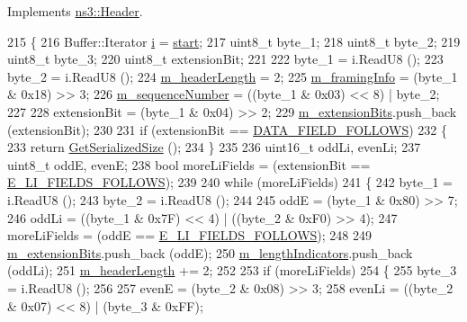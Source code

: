Implements \hyperlink{classns3_1_1Header_a78be9400bb66b2a8543606f395ef5396}{ns3\+::\+Header}.


\begin{DoxyCode}
215 \{
216   Buffer::Iterator \hyperlink{bernuolliDistribution_8m_a6f6ccfcf58b31cb6412107d9d5281426}{i} = \hyperlink{namespacevisualizer_1_1core_a2a35e5d8a34af358b508dac8635754e0}{start};
217   uint8\_t byte\_1;
218   uint8\_t byte\_2;
219   uint8\_t byte\_3;
220   uint8\_t extensionBit;
221 
222   byte\_1 = i.ReadU8 ();
223   byte\_2 = i.ReadU8 ();
224   \hyperlink{classns3_1_1LteRlcHeader_a75ea7af38421120ae0550c1977de4c1c}{m\_headerLength} = 2;
225   \hyperlink{classns3_1_1LteRlcHeader_a04ba07b60e76c561767f53295a830b39}{m\_framingInfo} = (byte\_1 & 0x18) >> 3;
226   \hyperlink{classns3_1_1LteRlcHeader_a345256a1a41193cae2f08b9918e438fc}{m\_sequenceNumber} = ((byte\_1 & 0x03) << 8) | byte\_2;
227 
228   extensionBit = (byte\_1 & 0x04) >> 2;
229   \hyperlink{classns3_1_1LteRlcHeader_a13cb89b13e1ac8572c960b764a30c69b}{m\_extensionBits}.push\_back (extensionBit);
230 
231   \textcolor{keywordflow}{if} (extensionBit == \hyperlink{classns3_1_1LteRlcHeader_a48248337dcddd6c1f6f79b75b898266aa244934a97b8fe6ca2786896ca48f04dd}{DATA\_FIELD\_FOLLOWS})
232     \{
233       \textcolor{keywordflow}{return} \hyperlink{classns3_1_1LteRlcHeader_ab9438faeeb5a7d22b39d9544feb01477}{GetSerializedSize} ();
234     \}
235 
236   uint16\_t oddLi, evenLi;
237   uint8\_t oddE, evenE;
238   \textcolor{keywordtype}{bool} moreLiFields = (extensionBit == \hyperlink{classns3_1_1LteRlcHeader_a48248337dcddd6c1f6f79b75b898266aac938d14a69d34c1fbea6822591cfe9de}{E\_LI\_FIELDS\_FOLLOWS});
239 
240   \textcolor{keywordflow}{while} (moreLiFields)
241     \{
242       byte\_1 = i.ReadU8 ();
243       byte\_2 = i.ReadU8 ();
244 
245       oddE = (byte\_1 & 0x80) >> 7;
246       oddLi = ((byte\_1 & 0x7F) << 4) | ((byte\_2 & 0xF0) >> 4);
247       moreLiFields = (oddE == \hyperlink{classns3_1_1LteRlcHeader_a48248337dcddd6c1f6f79b75b898266aac938d14a69d34c1fbea6822591cfe9de}{E\_LI\_FIELDS\_FOLLOWS});
248 
249       \hyperlink{classns3_1_1LteRlcHeader_a13cb89b13e1ac8572c960b764a30c69b}{m\_extensionBits}.push\_back (oddE);
250       \hyperlink{classns3_1_1LteRlcHeader_a7cc563904c11ad15d6e859521223ec46}{m\_lengthIndicators}.push\_back (oddLi);
251       \hyperlink{classns3_1_1LteRlcHeader_a75ea7af38421120ae0550c1977de4c1c}{m\_headerLength} += 2;
252 
253       \textcolor{keywordflow}{if} (moreLiFields)
254         \{
255           byte\_3 = i.ReadU8 ();
256 
257           evenE = (byte\_2 & 0x08) >> 3;
258           evenLi = ((byte\_2 & 0x07) << 8) | (byte\_3 & 0xFF);

\end{DoxyCode}

